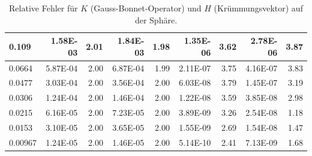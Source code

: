 \begin{table}[htbp]
\begin{tabular}{|l|r|r|r|r|r|r|r|r|}
            0.109 & 1.58E-03 & 2.01 & 1.84E-03 & 1.98 & 1.35E-06 & 3.62 & 2.78E-06 & 3.87 \\ \hline
            0.0664 & 5.87E-04 & 2.00 & 6.87E-04 & 1.99 & 2.11E-07 & 3.75 & 4.16E-07 & 3.83 \\ \hline
            0.0477 & 3.03E-04 & 2.00 & 3.56E-04 & 2.00 & 6.03E-08 & 3.79 & 1.45E-07 & 3.19 \\ \hline
            0.0306 & 1.24E-04 & 2.00 & 1.46E-04 & 2.00 & 1.22E-08 & 3.59 & 3.85E-08 & 2.98 \\ \hline
            0.0215 & 6.16E-05 & 2.00 & 7.23E-05 & 2.00 & 3.89E-09 & 3.26 & 2.54E-08 & 1.18 \\ \hline
            0.0153 & 3.10E-05 & 2.00 & 3.65E-05 & 2.00 & 1.55E-09 & 2.69 & 1.54E-08 & 1.47 \\ \hline
            0.00967 & 1.24E-05 & 2.00 & 1.46E-05 & 2.00 & 5.14E-10 & 2.41 & 7.13E-09 & 1.68 \\ \hline
      \end{tabular}
      \caption[Gauß-Bonnet und Krümmungsvektor auf der Sphäre]{Relative Fehler für \( K \) (Gauss-Bonnet-Operator) und \( H \) (Krümmungsvektor) auf der Sphäre.}
      \label{tabSphereGBLX}
   \end{table}
  

